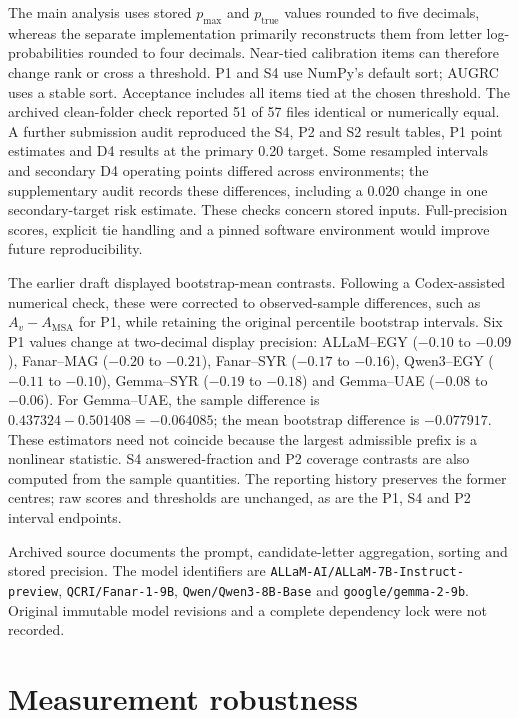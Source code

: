 \documentclass[applsci,article,submit,pdftex,oneauthor]{Definitions/mdpi}
\begin{document}


The main analysis uses stored $p_{\max}$ and $p_{\mathrm{true}}$ values rounded to five decimals, whereas the separate implementation primarily reconstructs them from letter log-probabilities rounded to four decimals. Near-tied calibration items can therefore change rank or cross a threshold. P1 and S4 use NumPy's default sort; AUGRC uses a stable sort. Acceptance includes all items tied at the chosen threshold. The archived clean-folder check reported 51 of 57 files identical or numerically equal. A further submission audit reproduced the S4, P2 and S2 result tables, P1 point estimates and D4 results at the primary 0.20 target. Some resampled intervals and secondary D4 operating points differed across environments; the supplementary audit records these differences, including a 0.020 change in one secondary-target risk estimate. These checks concern stored inputs. Full-precision scores, explicit tie handling and a pinned software environment would improve future reproducibility.

The earlier draft displayed bootstrap-mean contrasts. Following a Codex-assisted numerical check, these were corrected to observed-sample differences, such as $A_v-A_{\mathrm{MSA}}$ for P1, while retaining the original percentile bootstrap intervals. Six P1 values change at two-decimal display precision: ALLaM--EGY ($-0.10$ to $-0.09$), Fanar--MAG ($-0.20$ to $-0.21$), Fanar--SYR ($-0.17$ to $-0.16$), Qwen3--EGY ($-0.11$ to $-0.10$), Gemma--SYR ($-0.19$ to $-0.18$) and Gemma--UAE ($-0.08$ to $-0.06$). For Gemma--UAE, the sample difference is $0.437324-0.501408=-0.064085$; the mean bootstrap difference is $-0.077917$. These estimators need not coincide because the largest admissible prefix is a nonlinear statistic. S4 answered-fraction and P2 coverage contrasts are also computed from the sample quantities. The reporting history preserves the former centres; raw scores and thresholds are unchanged, as are the P1, S4 and P2 interval endpoints.

Archived source documents the prompt, candidate-letter aggregation, sorting and stored precision. The model identifiers are \nolinkurl{ALLaM-AI/ALLaM-7B-Instruct-preview}, \nolinkurl{QCRI/Fanar-1-9B}, \nolinkurl{Qwen/Qwen3-8B-Base} and \nolinkurl{google/gemma-2-9b}. Original immutable model revisions and a complete dependency lock were not recorded.

\FloatBarrier
\section{Measurement robustness}\label{robustness-tables}
\end{document}
